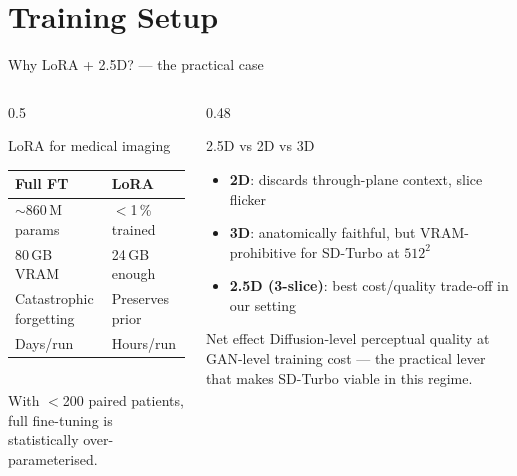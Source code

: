 \documentclass[aspectratio=169,10pt]{beamer}
\begin{document}
\section{Training Setup}
\begin{frame}{Why LoRA + 2.5D? --- the practical case}
\begin{columns}[T]
\begin{column}{0.5\textwidth}
\begin{block}{LoRA for medical imaging}
\footnotesize
\begin{tabular}{ll}
\toprule
\textbf{Full FT} & \textbf{LoRA} \\\midrule
$\sim$860\,M params & $<$1\,\% trained \\
80\,GB VRAM & 24\,GB enough \\
Catastrophic forgetting & Preserves prior \\
Days/run & Hours/run \\
\bottomrule
\end{tabular}
\vspace{1mm}\\
With $<$200 paired patients, full fine-tuning is statistically over-parameterised.
\end{block}
\end{column}
\begin{column}{0.48\textwidth}
\begin{block}{2.5D vs 2D vs 3D}
\footnotesize
\begin{itemize}
    \item \textbf{2D}: discards through-plane context, slice flicker
    \item \textbf{3D}: anatomically faithful, but VRAM-prohibitive for SD-Turbo at $512^{2}$
    \item \textbf{2.5D (3-slice)}: best cost/quality trade-off in our setting
\end{itemize}
\end{block}
\begin{exampleblock}{Net effect}
\scriptsize
Diffusion-level perceptual quality at GAN-level training cost --- the practical lever that makes SD-Turbo viable in this regime.
\end{exampleblock}
\end{column}
\end{columns}
\end{frame}
\end{document}
